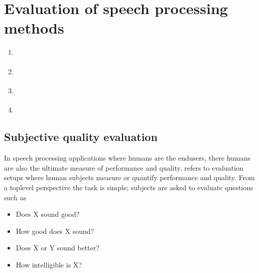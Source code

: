\documentclass[letterpaper,10pt,english]{jupyterBook}
\begin{document}
\sphinxstepscope


\chapter{Evaluation of speech processing methods}
\label{\detokenize{Evaluation_of_speech_processing_methods:evaluation-of-speech-processing-methods}}\label{\detokenize{Evaluation_of_speech_processing_methods::doc}}\begin{enumerate}
%
\item {} 
\sphinxAtStartPar
{\hyperref[\detokenize{Evaluation/Subjective_quality_evaluation::doc}]{}}

\item {} 
\sphinxAtStartPar
{\hyperref[\detokenize{Evaluation/Objective_quality_evaluation::doc}]{}}

\item {} 
\sphinxAtStartPar
{\hyperref[\detokenize{Evaluation/Other_performance_measures::doc}]{}}

\item {} 
\sphinxAtStartPar
{\hyperref[\detokenize{Evaluation/Analysis_of_evaluation_results::doc}]{}}

\end{enumerate}

\sphinxstepscope


\section{Subjective quality evaluation}
\label{\detokenize{Evaluation/Subjective_quality_evaluation:subjective-quality-evaluation}}\label{\detokenize{Evaluation/Subjective_quality_evaluation::doc}}
\sphinxAtStartPar
In speech processing applications where humans are the end\sphinxhyphen{}users, there
humans are also the ultimate measure of performance and quality.
 refers to evaluation setups where human subjects
measure or quantify performance and quality. From a top\sphinxhyphen{}level
perspective the task is simple; subjects are asked to evaluate questions
such as
\begin{itemize}
\item {} 
\sphinxAtStartPar
Does X sound good?

\item {} 
\sphinxAtStartPar
How good does X sound?

\item {} 
\sphinxAtStartPar
Does X or Y sound better?

\item {} 
\sphinxAtStartPar
How intelligible is X?

\end{itemize}
\end{document}
